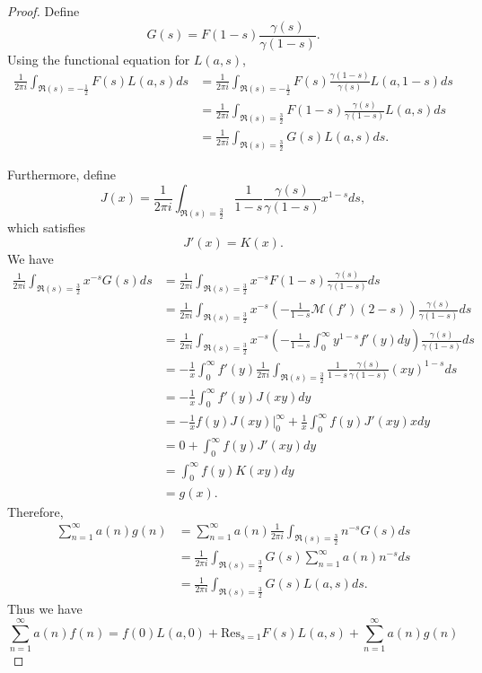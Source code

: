 \documentclass{article}
\newcommand{\Res}{\mathrm{Res}}
\theoremstyle{definition}
\begin{document}
\begin{proof}
Define
\[
G(s)=F(1-s) \frac{\gamma(s)}{\gamma(1-s)}.
\]
Using the functional equation for $L(a,s)$,
\begin{align*}
 \frac{1}{2\pi i} \int_{\Re(s)=-\frac{1}{2}} F(s)L(a,s) ds&=
  \frac{1}{2\pi i} \int_{\Re(s)=-\frac{1}{2}} F(s)\frac{\gamma(1-s)}{\gamma(s)} L(a,1-s) ds\\
 &=\frac{1}{2\pi i}  \int_{\Re(s)=\frac{3}{2}} F(1-s) \frac{\gamma(s)}{\gamma(1-s)}
 L(a,s) ds\\
 &=\frac{1}{2\pi i} \int_{\Re(s)=\frac{3}{2}} G(s) L(a,s) ds.
\end{align*}

Furthermore, define
\[
J(x) = \frac{1}{2\pi i} \int_{\Re(s)=\frac{3}{2}} \frac{1}{1-s} \frac{\gamma(s)}{\gamma(1-s)} x^{1-s} ds,
\]
which satisfies
\[
J'(x) = K(x).
\]
We have
\begin{align*}
\frac{1}{2\pi i} \int_{\Re(s)=\frac{3}{2}} x^{-s} G(s) ds&=\frac{1}{2\pi i} \int_{\Re(s)=\frac{3}{2}} x^{-s} F(1-s) \frac{\gamma(s)}{\gamma(1-s)} ds\\
&=\frac{1}{2\pi i} \int_{\Re(s)=\frac{3}{2}} x^{-s} \left(-\frac{1}{1-s} \mathscr{M}(f')(2-s)\right) \frac{\gamma(s)}{\gamma(1-s)} ds\\
&=\frac{1}{2\pi i} \int_{\Re(s)=\frac{3}{2}} x^{-s} 
\left(-\frac{1}{1-s} \int_0^\infty y^{1-s} f'(y) dy\right)  \frac{\gamma(s)}{\gamma(1-s)}  ds\\
&=-\frac{1}{x} \int_0^\infty f'(y)   \frac{1}{2\pi i} \int_{\Re(s)=\frac{3}{2}} \frac{1}{1-s}  \frac{\gamma(s)}{\gamma(1-s)}   (xy)^{1-s} ds\\
&=-\frac{1}{x} \int_0^\infty f'(y) J(xy) dy\\
&=-\frac{1}{x}f(y) J(xy) \bigg|_0^\infty + \frac{1}{x} \int_0^\infty f(y) J'(xy) x dy\\
&=0+\int_0^\infty f(y) J'(xy) dy\\
&=\int_0^\infty f(y) K(xy) dy\\
&=g(x).
\end{align*}
Therefore,
\begin{align*}
\sum_{n=1}^\infty a(n) g(n)&=\sum_{n=1}^\infty a(n) \frac{1}{2\pi i} \int_{\Re(s)=\frac{3}{2}} n^{-s} G(s) ds\\
&=\frac{1}{2\pi i} \int_{\Re (s)=\frac{3}{2}} G(s) \sum_{n=1}^\infty a(n) n^{-s} ds\\
&=\frac{1}{2\pi i} \int_{\Re(s)=\frac{3}{2}} G(s) L(a,s) ds.
\end{align*}
Thus we have
\[
\sum_{n=1}^\infty a(n) f(n)=f(0)L(a,0)+\Res_{s=1} F(s)L(a,s)
+ \sum_{n=1}^\infty a(n) g(n)
\]
\end{proof}
\end{document}

